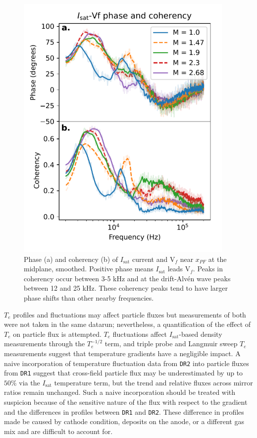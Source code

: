\begin{figure}
    \centering
    \includegraphics[width=300pt]{figures/fig9.pdf}
    \caption[Phase and coherency of $I_\text{sat}$ current and V$_f$ near $x_{PF}$]{Phase (a) and coherency (b) of $I_\text{sat}$ current and V$_f$ near $x_{PF}$ at the midplane, smoothed. Positive phase means $I_\text{sat}$ leads V$_f$. Peaks in coherency occur between 3-5 kHz and at the drift-Alv\'en wave peaks between 12 and 25 kHz. These coherency peaks tend to have larger phase shifts than other nearby frequencies. }
    \label{fig:isat-Vf_phase}
\end{figure}

$T_e$ profiles and fluctuations may affect particle fluxes but measurements of both were not taken in the same datarun; nevertheless, a quantification of the effect of $T_e$ on particle flux is attempted.
$T_e$ fluctuations affect $I_\text{sat}$-based density measurements through the $T_e^{-1/2}$ term, and triple probe and Langmuir sweep $T_e$ measurements suggest that temperature gradients have a negligible impact. A naive incorporation of temperature fluctuation data from \texttt{DR2} into particle fluxes from \texttt{DR1} suggest that cross-field particle flux may be underestimated by up to $50\%$ via the $I_\text{sat}$ temperature term, but the trend and relative fluxes across mirror ratios remain unchanged. Such a naive incorporation should be treated with suspicion because of the sensitive nature of the flux with respect to the gradient and the differences in profiles between \texttt{DR1} and \texttt{DR2}. These difference in profiles made be caused by cathode condition, deposits on the anode, or a different gas mix and are difficult to account for.

